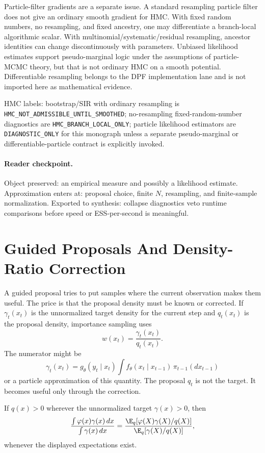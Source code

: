 Particle-filter gradients are a separate issue.  A standard resampling
particle filter does not give an ordinary smooth gradient for HMC.  With fixed
random numbers, no resampling, and fixed ancestry, one may differentiate a
branch-local algorithmic scalar.  With multinomial/systematic/residual
resampling, ancestor identities can change discontinuously with parameters.
Unbiased likelihood estimates support pseudo-marginal logic under the
assumptions of particle-MCMC theory, but that is not ordinary HMC on a smooth
potential.  Differentiable resampling belongs to the DPF implementation lane
and is not imported here as mathematical evidence.

HMC labels: bootstrap/SIR with ordinary resampling is
\texttt{HMC\_NOT\_ADMISSIBLE\_UNTIL\_SMOOTHED}; no-resampling fixed-random-number
diagnostics are \texttt{HMC\_BRANCH\_LOCAL\_ONLY}; particle likelihood estimators are
\texttt{DIAGNOSTIC\_ONLY} for this monograph unless a separate pseudo-marginal or
differentiable-particle contract is explicitly invoked.

\paragraph{Reader checkpoint.}
Object preserved: an empirical measure and possibly a likelihood estimate.
Approximation enters at: proposal choice, finite \(N\), resampling, and
finite-sample normalization.  Exported to synthesis: collapse diagnostics veto
runtime comparisons before speed or ESS-per-second is meaningful.

\section{Guided Proposals And Density-Ratio Correction}
\label{sec:bf-hd-guided-proposals}

A guided proposal tries to put samples where the current observation makes them
useful.  The price is that the proposal density must be known or corrected.  If
\(\gamma_t(x_t)\) is the unnormalized target density for the current step and
\(q_t(x_t)\) is the proposal density, importance sampling uses
\[
  w(x_t)=\frac{\gamma_t(x_t)}{q_t(x_t)}.
\]
The numerator might be
\[
  \gamma_t(x_t)
  =
  g_\theta(y_t\mid x_t)
  \int f_\theta(x_t\mid x_{t-1})\,\pi_{t-1}(dx_{t-1})
\]
or a particle approximation of this quantity.  The proposal \(q_t\) is not
the target.  It becomes useful only through the correction.

\begin{proposition}
\label{prop:bf-hd-corrected-proposal}
If \(q(x)>0\) wherever the unnormalized target \(\gamma(x)>0\), then
\[
  \frac{\int \varphi(x)\gamma(x)\,dx}{\int\gamma(x)\,dx}
  =
  \frac{\E_q[\varphi(X)\gamma(X)/q(X)]}
       {\E_q[\gamma(X)/q(X)]},
\]
whenever the displayed expectations exist.
\end{proposition}

